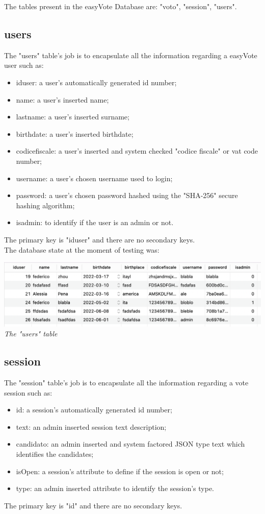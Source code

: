 \documentclass[11pt, oneside]{article}   	%
\begin{document}
The tables present in the easyVote Database are: "voto", "session", "users".
\pagebreak

\subsection{users}
The "users" table's job is to encapsulate all the information regarding a easyVote user such as:
\begin{itemize}
    \item iduser: a user's automatically generated id number;
    \item name: a user's inserted name;
    \item lastname: a user's inserted surname;
    \item birthdate: a user's inserted birthdate;
    \item codicefiscale: a user's inserted and system checked "codice fiscale" or vat code number;
    \item username: a user's chosen username used to login;
    \item password: a user's chosen password hashed using the "SHA-256" secure hashing algorithm;
    \item isadmin: to identify if the user is an admin or not.
\end{itemize}
The primary key is "iduser" and there are no secondary keys.\\

The database state at the moment of testing was: 
    \begin{center}
    \includegraphics[scale=0.5]{images/voto2.png}\\
    \emph{The "users" table}
    \end{center}
    
    
\pagebreak

\subsection{session}
The "session" table's job is to encapsulate all the information regarding a vote session such as:
\begin{itemize}
    \item id: a session's automatically generated id number;
    \item text: an admin inserted session text description;
    \item candidato: an admin inserted and system factored JSON type text which identifies the candidates;
    \item isOpen: a session's attribute to define if the session is open or not;
    \item type: an admin inserted attribute to identify the session's type.
\end{itemize}
The primary key is "id" and there are no secondary keys.\\
\end{document}
